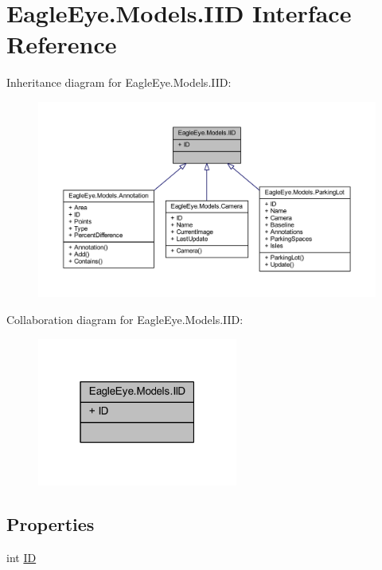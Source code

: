 \hypertarget{interface_eagle_eye_1_1_models_1_1_i_i_d}{}\section{Eagle\+Eye.\+Models.\+I\+ID Interface Reference}
\label{interface_eagle_eye_1_1_models_1_1_i_i_d}


 




Inheritance diagram for Eagle\+Eye.\+Models.\+I\+ID\+:\nopagebreak
\begin{figure}[H]
\begin{center}
\leavevmode
\includegraphics[width=350pt]{interface_eagle_eye_1_1_models_1_1_i_i_d__inherit__graph}
\end{center}
\end{figure}


Collaboration diagram for Eagle\+Eye.\+Models.\+I\+ID\+:\nopagebreak
\begin{figure}[H]
\begin{center}
\leavevmode
\includegraphics[width=187pt]{interface_eagle_eye_1_1_models_1_1_i_i_d__coll__graph}
\end{center}
\end{figure}
\subsection*{Properties}
\begin{DoxyCompactItemize}
\item 
int \mbox{\hyperlink{interface_eagle_eye_1_1_models_1_1_i_i_d_a9c97af76fec2f38889ea261ce98ca5f1}{ID}}
\end{DoxyCompactItemize}


